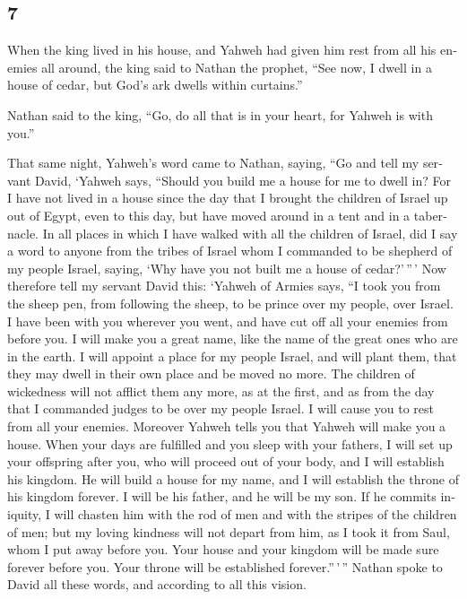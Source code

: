 \begin{paracol}{2}
\switchcolumn
\begin{otherlanguage}{english}

\hypertarget{section-13}{%
\section{7}\label{section-13}}

 When the king lived in his house, and Yahweh had given
him rest from all his enemies all around,  the king said
to Nathan the prophet, ``See now, I dwell in a house of cedar, but God's
ark dwells within curtains.''

 Nathan said to the king, ``Go, do all that is in your
heart, for Yahweh is with you.''

 That same night, Yahweh's word came to Nathan, saying,
 ``Go and tell my servant David, `Yahweh says, ``Should
you build me a house for me to dwell in?  For I have not
lived in a house since the day that I brought the children of Israel up
out of Egypt, even to this day, but have moved around in a tent and in a
tabernacle.  In all places in which I have walked with all
the children of Israel, did I say a word to anyone from the tribes of
Israel whom I commanded to be shepherd of my people Israel, saying, `Why
have you not built me a house of cedar?'\,''\,'  Now
therefore tell my servant David this: `Yahweh of Armies says, ``I took
you from the sheep pen, from following the sheep, to be prince over my
people, over Israel.  I have been with you wherever you
went, and have cut off all your enemies from before you. I will make you
a great name, like the name of the great ones who are in the earth.
 I will appoint a place for my people Israel, and will
plant them, that they may dwell in their own place and be moved no more.
The children of wickedness will not afflict them any more, as at the
first,  and as from the day that I commanded judges to be
over my people Israel. I will cause you to rest from all your enemies.
Moreover Yahweh tells you that Yahweh will make you a house.
 When your days are fulfilled and you sleep with your
fathers, I will set up your offspring after you, who will proceed out of
your body, and I will establish his kingdom.  He will
build a house for my name, and I will establish the throne of his
kingdom forever.  I will be his father, and he will be my
son. If he commits iniquity, I will chasten him with the rod of men and
with the stripes of the children of men;  but my loving
kindness will not depart from him, as I took it from Saul, whom I put
away before you.  Your house and your kingdom will be
made sure forever before you. Your throne will be established
forever.''\,'\,''  Nathan spoke to David all these words,
and according to all this vision.


\end{otherlanguage}
\end{paracol}
